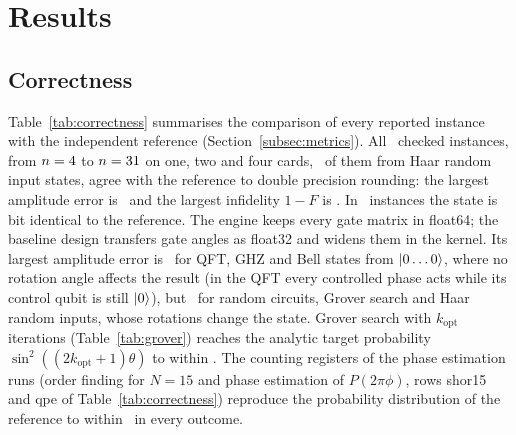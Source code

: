 \section{Results}\label{sec:results}

\subsection{Correctness}\label{subsec:res-correctness}

Table~\ref{tab:correctness} summarises the comparison of every reported instance with the independent reference
(Section~\ref{subsec:metrics}). All \NumCorrectnessInstances~checked instances, from $n=4$ to
$n=31$ on one, two and four cards, \NumCorrectnessHaar~of them from Haar random input states, agree with the
reference to double precision rounding: the largest amplitude error is \NumWorstMaxAbsErr\ and the largest infidelity
$1-F$ is \NumWorstOneMinusF. In \NumCorrectnessExact~instances the state is bit identical to the reference. The engine keeps every gate matrix in
float64; the baseline design transfers gate angles as float32 and widens them in the kernel. Its largest amplitude
error is \NumBaselineExactErrMax\ for QFT, GHZ and Bell states from $\ket{0\dots0}$, where no rotation angle affects the
result (in the QFT every controlled phase acts while its control qubit is still $\lvert 0\rangle$), but \NumBaselineRotErrMax\ for
random circuits, Grover search and Haar random inputs, whose rotations change the state. Grover search with $k_{\mathrm{opt}}$ iterations
(Table~\ref{tab:grover}) reaches the analytic target probability $\sin^2((2k_{\mathrm{opt}}+1)\theta)$ to within
\NumGroverWorstPdiff. The counting registers of the phase estimation runs (order finding for $N=15$ and phase estimation
of $P(2\pi\phi)$, rows shor15 and qpe of Table~\ref{tab:correctness}) reproduce the probability distribution of the
reference to within \NumQpeWorstDistDiff~in every outcome.

\begin{table}[t]
\caption{Correctness of the engine: worst values over all instances of each circuit family, after optimal
global phase alignment. Instances: every width and card count of the campaign; zero input $\ket{0\dots0}$ or Haar random.}\label{tab:correctness}

\end{table}

\begin{table}[t]
\caption{Grover search with $k_{\mathrm{opt}}$ iterations on four cards: measured target probability against
$P(k_{\mathrm{opt}}) = \sin^2((2k_{\mathrm{opt}}+1)\theta)$.}\label{tab:grover}

\end{table}

